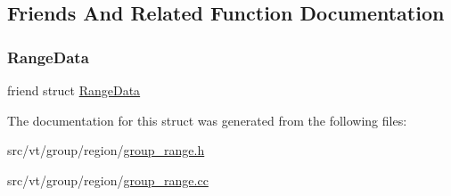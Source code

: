 \subsection{Friends And Related Function Documentation}
\mbox{\label{structvt_1_1group_1_1region_1_1_range_a2a3990246b3bab9c29636b30aa9741ac}} 
\subsubsection{\texorpdfstring{Range\+Data}{RangeData}}
{\footnotesize\ttfamily friend struct \hyperlink{structvt_1_1group_1_1region_1_1_range_data}{Range\+Data}\hspace{0.3cm}{\ttfamily [friend]}}



The documentation for this struct was generated from the following files\+:\begin{DoxyCompactItemize}
\item 
src/vt/group/region/\hyperlink{group__range_8h}{group\+\_\+range.\+h}\item 
src/vt/group/region/\hyperlink{group__range_8cc}{group\+\_\+range.\+cc}\end{DoxyCompactItemize}
